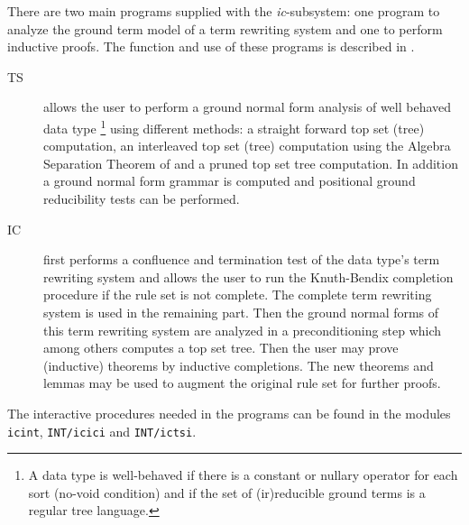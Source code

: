 There are two main programs supplied with the {\it ic}-subsystem:
one program to analyze the ground term model of a term rewriting system
and one to perform inductive proofs.
The function and use of these programs is described in 
\RUD.
\begin{description}
 \item[TS]  allows the user to perform a ground normal form analysis of 
            well behaved data type \footnote{A data type is well-behaved if 
            there is a constant or nullary operator for each sort (no-void 
            condition) and if the set of (ir)reducible ground terms is a 
            regular tree language.}
            using different methods: 
            a straight forward top set
            (tree) computation, an interleaved top set (tree) computation
            using the Algebra Separation Theorem of
            \cite{BuendgenKuechlin:89} and a pruned top set tree computation.
            In addition a ground normal form grammar is computed and 
            positional ground reducibility tests can be performed.
 \item[IC]  first performs a confluence and termination test of the data type's
            term rewriting system and allows the user to run the 
            Knuth-Bendix completion procedure if the rule set is not complete.
            The complete term rewriting system is used in the remaining
            part.
            Then the ground normal forms of this term rewriting system are
            analyzed in a preconditioning step which among others computes
            a top set tree.
            Then the user may prove (inductive) theorems by inductive 
            completions.
            The new theorems and lemmas may be used to augment the original
            rule set for further proofs.
\end{description}

The interactive procedures needed in the programs can be found in the modules
{\tt icint}, {\tt INT/icici} and {\tt INT/ictsi}.

